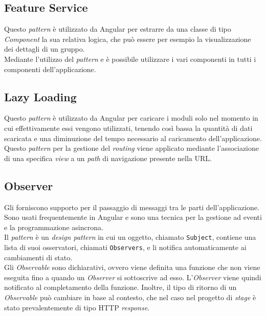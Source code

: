 \subsection{Feature Service}
Questo \textit{pattern} è utilizzato da Angular per estrarre da una classe di
tipo \textit{Component} la sua relativa logica, che può essere per esempio la
visualizzazione dei dettagli di un gruppo.\\
Mediante l'utilizzo del \textit{pattern}  e
 è possibile utilizzare i vari componenti in
tutti i componenti dell'applicazione. \cite{site-feature-modules}
\subsection{Lazy Loading}
Questo \textit{pattern} è utilizzato da Angular per caricare i moduli solo nel
momento in cui effettivamente essi vengono utilizzati, tenendo così bassa la
quantità di dati scaricata e una diminuzione del tempo
necessario al caricamento dell'applicazione.\\
Questo \textit{pattern} per la gestione del \textit{routing} viene applicato
mediante l'associazione di una specifica \textit{view} a un \textit{path} di
navigazione presente nella \gls{URL}.\cite{site-lazy-loading}



\subsection{Observer}
Gli  forniscono supporto per il passaggio di messaggi tra le
parti dell'applicazione. Sono usati frequentemente in Angular e sono una
tecnica per la gestione ad eventi e la programmazione asincrona.\\
Il \textit{pattern}  è un \textit{design pattern} in cui un
oggetto, chiamato \texttt{Subject}, contiene una lista di suoi osservatori,
chiamati \texttt{Observers}, e li notifica automaticamente ai cambiamenti di
stato.\\
Gli \textit{Observable} sono dichiarativi, ovvero viene definita una funzione
che non viene eseguita fino a quando un \textit{Observer} si sottoscrive ad
esso. L'\textit{Observer} viene quindi notificato al completamento della
funzione. Inoltre, il tipo di ritorno di un \textit{Observable} può cambiare in
base al contesto, che nel caso nel progetto di \textit{stage} è stato
prevalentemente di tipo HTTP \textit{response}. \cite{site-observable}\\

